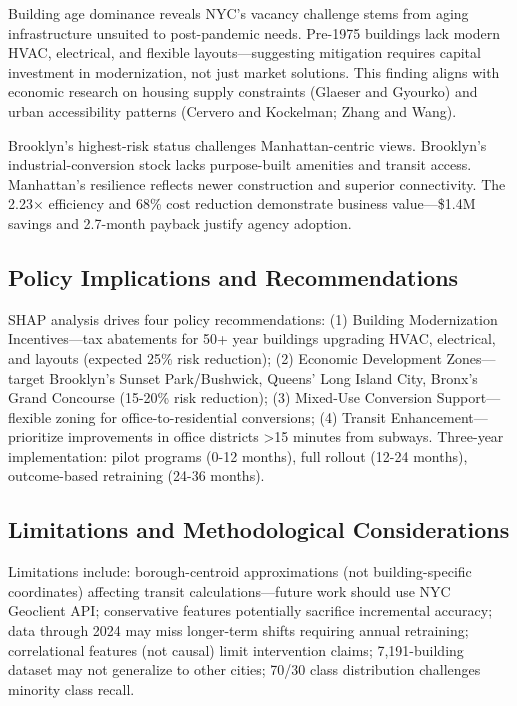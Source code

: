 \documentclass[12pt,letterpaper]{article}
\begin{document}
Building age dominance reveals NYC's vacancy challenge stems from aging infrastructure unsuited to post-pandemic needs. Pre-1975 buildings lack modern HVAC, electrical, and flexible layouts—suggesting mitigation requires capital investment in modernization, not just market solutions. This finding aligns with economic research on housing supply constraints (Glaeser and Gyourko) and urban accessibility patterns (Cervero and Kockelman; Zhang and Wang).

Brooklyn's highest-risk status challenges Manhattan-centric views. Brooklyn's industrial-conversion stock lacks purpose-built amenities and transit access. Manhattan's resilience reflects newer construction and superior connectivity. The 2.23× efficiency and 68\% cost reduction demonstrate business value—\$1.4M savings and 2.7-month payback justify agency adoption.

\subsection*{Policy Implications and Recommendations}

SHAP analysis drives four policy recommendations: (1) Building Modernization Incentives—tax abatements for 50+ year buildings upgrading HVAC, electrical, and layouts (expected 25\% risk reduction); (2) Economic Development Zones—target Brooklyn's Sunset Park/Bushwick, Queens' Long Island City, Bronx's Grand Concourse (15-20\% risk reduction); (3) Mixed-Use Conversion Support—flexible zoning for office-to-residential conversions; (4) Transit Enhancement—prioritize improvements in office districts >15 minutes from subways. Three-year implementation: pilot programs (0-12 months), full rollout (12-24 months), outcome-based retraining (24-36 months).

\subsection*{Limitations and Methodological Considerations}

Limitations include: borough-centroid approximations (not building-specific coordinates) affecting transit calculations—future work should use NYC Geoclient API; conservative features potentially sacrifice incremental accuracy; data through 2024 may miss longer-term shifts requiring annual retraining; correlational features (not causal) limit intervention claims; 7,191-building dataset may not generalize to other cities; 70/30 class distribution challenges minority class recall.
\end{document}
